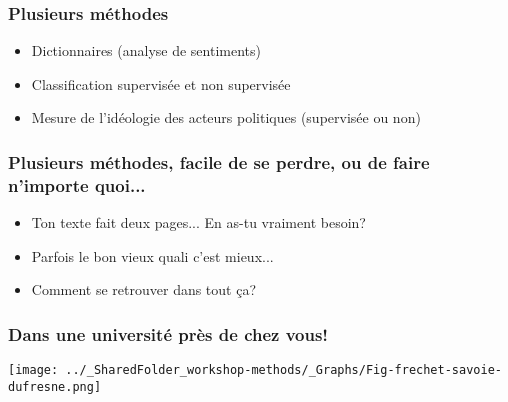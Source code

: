 \documentclass{beamer}
\begin{document}

\begin{frame}
      
      \frametitle{Plusieurs méthodes} \vspace{1cm}
      
           \begin{itemize}
           
           \item Dictionnaires (analyse de sentiments)
           \item<2-> Classification supervisée et non supervisée
           \item<3-> Mesure de l'idéologie des acteurs politiques (supervisée ou non)
           
      \end{itemize}
           
 \end{frame}
     

 \begin{frame}
      
      \frametitle{Plusieurs méthodes, facile de se perdre, ou de faire n'importe quoi...} \vspace{1cm}
 
           \begin{itemize}
 
                \item Ton texte fait deux pages... En as-tu vraiment besoin?
                 \item<2-> Parfois le bon vieux quali c'est mieux...
                  \item<3-> Comment se retrouver dans tout ça? 
 
        \end{itemize}
 
 \end{frame}



\begin{frame}

       \frametitle{Dans une université près de chez vous!} \vspace{1cm}

          \begin{center}

            \texttt{[image: ../\_SharedFolder\_workshop-methods/\_Graphs/Fig-frechet-savoie-dufresne.png]}
            
       \end{center}

\end{frame}
\end{document}
